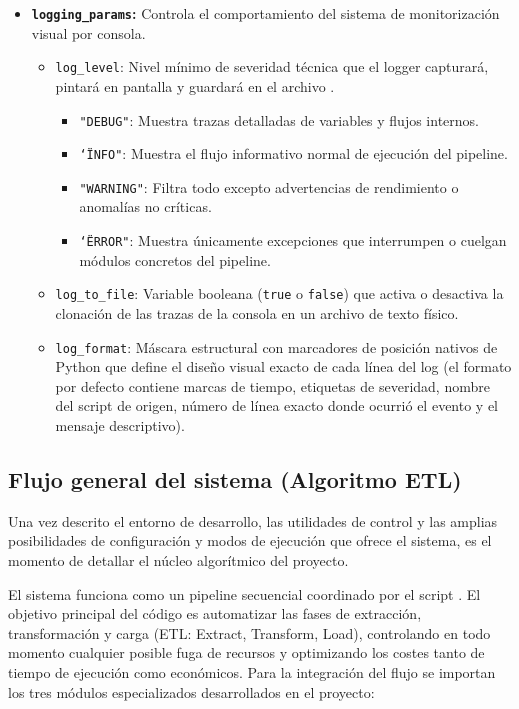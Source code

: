 \begin{itemize}
    \item \textbf{\texttt{logging\_params}:}
    Controla el comportamiento del sistema de monitorización visual por consola.
    \begin{itemize}
        \item \texttt{log\_level}: Nivel mínimo de severidad técnica que el logger capturará, pintará en pantalla y guardará en el archivo .
        \begin{itemize}
            \item \texttt{"DEBUG"}: Muestra trazas detalladas de variables y flujos internos.
            \item \texttt{\char`\"INFO"}: Muestra el flujo informativo normal de ejecución del pipeline.
            \item \texttt{"WARNING"}: Filtra todo excepto advertencias de rendimiento o anomalías no críticas.
            \item \texttt{\char`\"ERROR"}: Muestra únicamente excepciones que interrumpen o cuelgan módulos concretos del pipeline.
        \end{itemize}
        \item \texttt{log\_to\_file}: Variable booleana (\texttt{true} o \texttt{false}) que activa o desactiva la clonación de las trazas de la consola en un archivo de texto físico.
        \item \texttt{log\_format}: Máscara estructural con marcadores de posición nativos de Python que define el diseño visual exacto de cada línea del log (el formato por defecto contiene marcas de tiempo, etiquetas de severidad, nombre del script de origen, número de línea exacto donde ocurrió el evento y el mensaje descriptivo).
    \end{itemize}
\end{itemize}

\subsection{Flujo general del sistema (Algoritmo ETL)}
Una vez descrito el entorno de desarrollo, las utilidades de control y las amplias posibilidades de configuración y modos de ejecución que ofrece el sistema, es el momento de detallar el núcleo algorítmico del proyecto.

El sistema funciona como un pipeline secuencial coordinado por el script . El objetivo principal del código es automatizar las fases de extracción, transformación y carga (ETL: Extract, Transform, Load), controlando en todo momento cualquier posible fuga de recursos y optimizando los costes tanto de tiempo de ejecución como económicos. Para la integración del flujo se importan los tres módulos especializados desarrollados en el proyecto:

